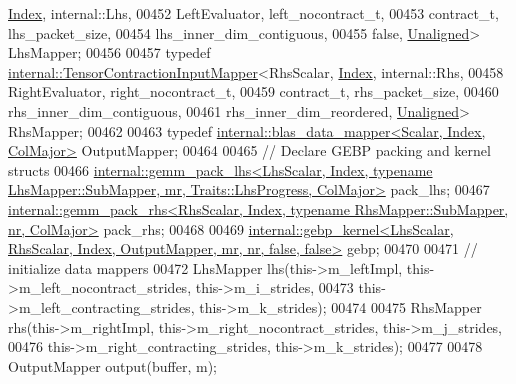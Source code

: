 \begin{DoxyCode}
      \hyperlink{namespace_eigen_a62e77e0933482dafde8fe197d9a2cfde}{Index}, internal::Lhs,
00452                                                    LeftEvaluator, left\_nocontract\_t,
00453                                                    contract\_t, lhs\_packet\_size,
00454                                                    lhs\_inner\_dim\_contiguous,
00455                                                    \textcolor{keyword}{false}, \hyperlink{group__enums_gga45fe06e29902b7a2773de05ba27b47a1ac935220b4c844108e183ebe30a4d5204}{Unaligned}> LhsMapper;
00456 
00457     \textcolor{keyword}{typedef} \hyperlink{class_eigen_1_1internal_1_1_tensor_contraction_input_mapper}{internal::TensorContractionInputMapper}<RhsScalar, 
      \hyperlink{namespace_eigen_a62e77e0933482dafde8fe197d9a2cfde}{Index}, internal::Rhs,
00458                                                    RightEvaluator, right\_nocontract\_t,
00459                                                    contract\_t, rhs\_packet\_size,
00460                                                    rhs\_inner\_dim\_contiguous,
00461                                                    rhs\_inner\_dim\_reordered, 
      \hyperlink{group__enums_gga45fe06e29902b7a2773de05ba27b47a1ac935220b4c844108e183ebe30a4d5204}{Unaligned}> RhsMapper;
00462 
00463     \textcolor{keyword}{typedef} \hyperlink{class_eigen_1_1internal_1_1blas__data__mapper}{internal::blas\_data\_mapper<Scalar, Index, ColMajor>}
       OutputMapper;
00464 
00465     \textcolor{comment}{// Declare GEBP packing and kernel structs}
00466     
      \hyperlink{struct_eigen_1_1internal_1_1gemm__pack__lhs}{internal::gemm\_pack\_lhs<LhsScalar, Index, typename LhsMapper::SubMapper, mr, Traits::LhsProgress, ColMajor>}
       pack\_lhs;
00467     
      \hyperlink{struct_eigen_1_1internal_1_1gemm__pack__rhs}{internal::gemm\_pack\_rhs<RhsScalar, Index, typename RhsMapper::SubMapper, nr, ColMajor>}
       pack\_rhs;
00468 
00469     
      \hyperlink{struct_eigen_1_1internal_1_1gebp__kernel}{internal::gebp\_kernel<LhsScalar, RhsScalar, Index, OutputMapper, mr, nr, false, false>}
       gebp;
00470 
00471     \textcolor{comment}{// initialize data mappers}
00472     LhsMapper lhs(this->m\_leftImpl, this->m\_left\_nocontract\_strides, this->m\_i\_strides,
00473                   this->m\_left\_contracting\_strides, this->m\_k\_strides);
00474 
00475     RhsMapper rhs(this->m\_rightImpl, this->m\_right\_nocontract\_strides, this->m\_j\_strides,
00476                   this->m\_right\_contracting\_strides, this->m\_k\_strides);
00477 
00478     OutputMapper output(buffer, m);

\end{DoxyCode}
